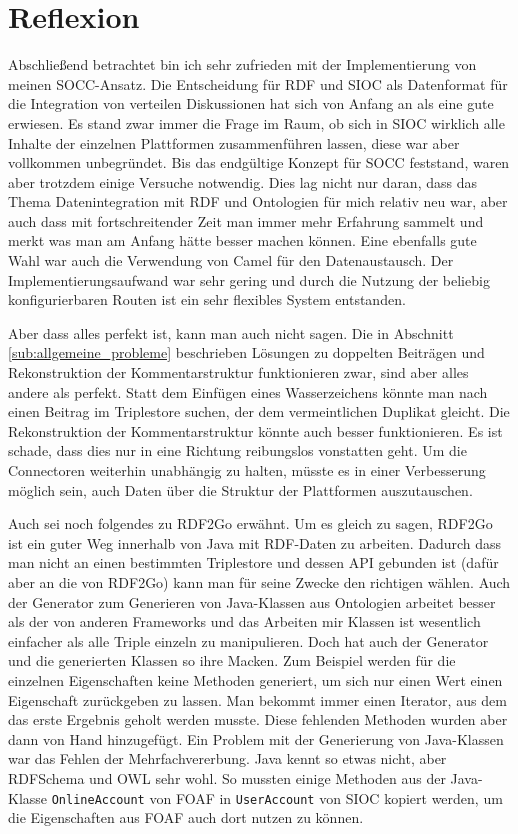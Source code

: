 \section{Reflexion} %
\label{sec:bewertung}

Abschließend betrachtet bin ich sehr zufrieden mit der Implementierung von meinen SOCC-Ansatz. Die Entscheidung für RDF und SIOC als Datenformat für die Integration von verteilen Diskussionen hat sich von Anfang an als eine gute erwiesen. Es stand zwar immer die Frage im Raum, ob sich in SIOC wirklich alle Inhalte der einzelnen Plattformen zusammenführen lassen, diese war aber vollkommen unbegründet. Bis das endgültige Konzept für SOCC feststand, waren aber trotzdem einige Versuche notwendig. Dies lag nicht nur daran, dass das Thema Datenintegration mit RDF und Ontologien für mich relativ neu war, aber auch dass mit fortschreitender Zeit man immer mehr Erfahrung sammelt und merkt was man am Anfang hätte besser machen können. Eine ebenfalls gute Wahl war auch die Verwendung von Camel für den Datenaustausch. Der Implementierungsaufwand war sehr gering und durch die Nutzung der beliebig konfigurierbaren Routen ist ein sehr flexibles System entstanden. 

Aber dass alles perfekt ist, kann man auch nicht sagen. Die in Abschnitt \ref{sub:allgemeine_probleme} beschrieben Lösungen zu doppelten Beiträgen und Rekonstruktion der Kommentarstruktur funktionieren zwar, sind aber alles andere als perfekt. Statt dem Einfügen eines Wasserzeichens könnte man nach einen Beitrag im Triplestore suchen, der dem vermeintlichen Duplikat gleicht. Die Rekonstruktion der Kommentarstruktur könnte auch besser funktionieren. Es ist schade, dass dies nur in eine Richtung reibungslos vonstatten geht. Um die Connectoren weiterhin unabhängig zu halten, müsste es in einer Verbesserung möglich sein, auch Daten über die Struktur der Plattformen auszutauschen. 

Auch sei noch folgendes zu RDF2Go erwähnt. Um es gleich zu sagen, RDF2Go ist ein guter Weg innerhalb von Java mit RDF-Daten zu arbeiten. Dadurch dass man nicht an einen bestimmten Triplestore und dessen API gebunden ist (dafür aber an die von RDF2Go) kann man für seine Zwecke den richtigen wählen. Auch der Generator zum Generieren von Java-Klassen aus Ontologien arbeitet besser als der von anderen Frameworks und das Arbeiten mir Klassen ist wesentlich einfacher als alle Triple einzeln zu manipulieren. Doch hat auch der Generator und die generierten Klassen so ihre Macken. Zum Beispiel werden für die einzelnen Eigenschaften keine Methoden generiert, um sich nur einen Wert einen Eigenschaft zurückgeben zu lassen. Man bekommt immer einen Iterator, aus dem das erste Ergebnis geholt werden musste. Diese fehlenden Methoden wurden aber dann von Hand hinzugefügt. Ein Problem mit der Generierung von Java-Klassen war das Fehlen der Mehrfachvererbung. Java kennt so etwas nicht, aber RDFSchema und OWL sehr wohl. So mussten einige Methoden aus der Java-Klasse \texttt{OnlineAccount} von FOAF in \texttt{UserAccount} von SIOC kopiert werden, um die Eigenschaften aus FOAF auch dort nutzen zu können.

